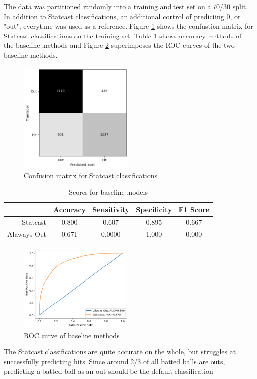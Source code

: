 \documentclass[12pt,letterpaper]{article}
\begin{document}
The data was partitioned randomly into a training and test set on a 70/30 split. In addition to Statcast classifications, an additional control of predicting 0, or "out", everytime was used as a reference. Figure \ref{fig:baseline_cm} shows the confustion matrix for Statcast classifications on the training set. Table \ref{tab:baseline_acc} shows accuracy methods of the baseline methods and Figure \ref{fig:baseline_roc} superimposes the ROC curves of the two baseline methods. 

\begin{figure}[!htb]
    \centering
    \includegraphics[width=0.5\textwidth]{baseline_cm}
    \caption{Confusion matrix for Statcast classifications}
    \label{fig:baseline_cm}
\end{figure}

\begin{table}[!htb]
    \centering
    \begin{tabular}{|r|c|c|c|c|}
        \hline
        & Accuracy & Sensitivity & Specificity & F1 Score \\ \hline
        Statcast & 0.800 & 0.607 & 0.895 & 0.667 \\ \hline
        Alaways Out & 0.671 & 0.0000 & 1.000 & 0.000 \\ \hline
    \end{tabular}
    \caption{Scores for baseline models}
    \label{tab:baseline_acc}
\end{table}

\begin{figure}[!htb]
    \centering
    \includegraphics[width=0.5\textwidth]{baseline_roc}
    \caption{ROC curve of baseline methods}
    \label{fig:baseline_roc}
\end{figure}

The Statcast classifications are quite accurate on the whole, but struggles at successfully predicting hits. Since around 2/3 of all batted balls are outs, predicting a batted ball as an out should be the default classification. 
\end{document}
